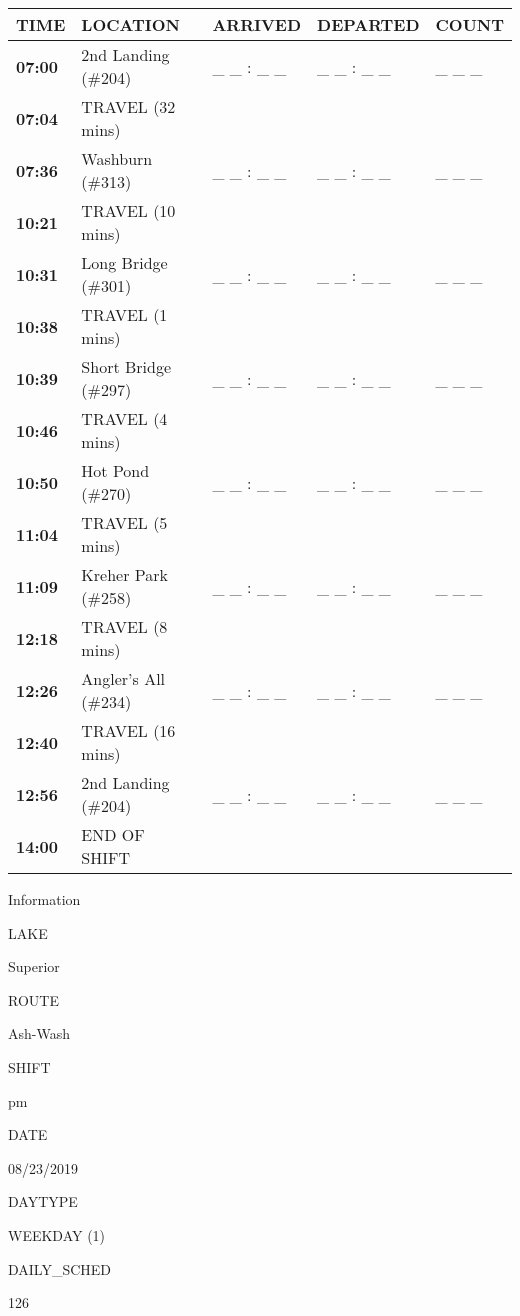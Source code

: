 \documentclass[]{article}
\begin{document}
\begin{tabular}{>{\bfseries}lllll}
\toprule
\textbf{TIME} & \textbf{LOCATION} & \textbf{ARRIVED} & \textbf{DEPARTED} & \textbf{COUNT}\\
\midrule
07:00 & 2nd Landing (\#204) & \_ \_ : \_ \_ & \_ \_ : \_ \_ & \_ \_ \_\\
07:04 & TRAVEL (32 mins) &  &  & \\
07:36 & Washburn (\#313) & \_ \_ : \_ \_ & \_ \_ : \_ \_ & \_ \_ \_\\
10:21 & TRAVEL (10 mins) &  &  & \\
10:31 & Long Bridge (\#301) & \_ \_ : \_ \_ & \_ \_ : \_ \_ & \_ \_ \_\\
10:38 & TRAVEL (1 mins) &  &  & \\
10:39 & Short Bridge (\#297) & \_ \_ : \_ \_ & \_ \_ : \_ \_ & \_ \_ \_\\
10:46 & TRAVEL (4 mins) &  &  & \\
10:50 & Hot Pond (\#270) & \_ \_ : \_ \_ & \_ \_ : \_ \_ & \_ \_ \_\\
11:04 & TRAVEL (5 mins) &  &  & \\
11:09 & Kreher Park (\#258) & \_ \_ : \_ \_ & \_ \_ : \_ \_ & \_ \_ \_\\
12:18 & TRAVEL (8 mins) &  &  & \\
12:26 & Angler's All (\#234) & \_ \_ : \_ \_ & \_ \_ : \_ \_ & \_ \_ \_\\
12:40 & TRAVEL (16 mins) &  &  & \\
12:56 & 2nd Landing (\#204) & \_ \_ : \_ \_ & \_ \_ : \_ \_ & \_ \_ \_\\
14:00 & END OF SHIFT &  &  & \\
\bottomrule
\end{tabular}\newpage

Information

LAKE

Superior

ROUTE

Ash-Wash

SHIFT

pm

DATE

08/23/2019

DAYTYPE

WEEKDAY (1)

DAILY\_SCHED

126

\vspace{24pt}
\end{document}
